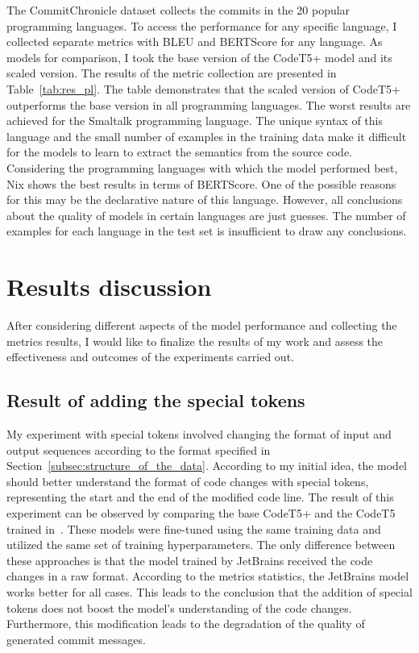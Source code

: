 The CommitChronicle dataset collects the commits in the 20 popular programming languages. To access the performance for any specific language, I collected separate metrics with BLEU and BERTScore for any language. As models for comparison, I took the base version of the CodeT5+ model and its scaled version. The results of the metric collection are presented in Table~\ref{tab:res_pl}. The table demonstrates that the scaled version of CodeT5+ outperforms the base version in all programming languages.
The worst results are achieved for the Smaltalk programming language. The unique syntax of this language and the small number of examples in the training data make it difficult for the models to learn to extract the semantics from the source code. Considering the programming languages with which the model performed best, Nix shows the best results in terms of BERTScore. One of the possible reasons for this may be the declarative nature of this language. 
However, all conclusions about the quality of models in certain languages are just guesses. The number of examples for each language in the test set is insufficient to draw any conclusions. 

\section{Results discussion}
After considering different aspects of the model performance and collecting the metrics results, I would like to finalize the results of my work and assess the effectiveness and outcomes of the experiments carried out. 

\subsection{Result of adding the special tokens}
My experiment with special tokens involved changing the format of input and output sequences according to the format specified in Section~\ref{subsec:structure_of_the_data}. According to my initial idea, the model should better understand the format of code changes with special tokens, representing the start and the end of the modified code line. The result of this experiment can be observed by comparing the base CodeT5+ and the CodeT5 trained in~\cite{eliseeva2023commit}. These models were fine-tuned using the same training data and utilized the same set of training hyperparameters. The only difference between these approaches is that the model trained by JetBrains received the code changes in a raw format. 
According to the metrics statistics, the JetBrains model works better for all cases. This leads to the conclusion that the addition of special tokens does not boost the model's understanding of the code changes. Furthermore, this modification leads to the degradation of the quality of generated commit messages. 


